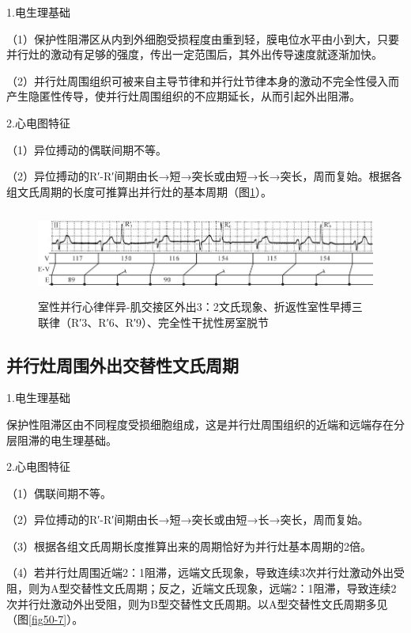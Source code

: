 1.电生理基础

（1）保护性阻滞区从内到外细胞受损程度由重到轻，膜电位水平由小到大，只要并行灶的激动有足够的强度，传出一定范围后，其外出传导速度就逐渐加快。

（2）并行灶周围组织可被来自主导节律和并行灶节律本身的激动不完全性侵入而产生隐匿性传导，使并行灶周围组织的不应期延长，从而引起外出阻滞。

2.心电图特征

（1）异位搏动的偶联间期不等。

（2）异位搏动的R′-R′间期由长→短→突长或由短→长→突长，周而复始。根据各组文氏周期的长度可推算出并行灶的基本周期（图\ref{fig16-19}）。

\begin{figure}[!htbp]
 \centering
 \includegraphics[width=5.78125in,height=1.11458in]{./images/Image00295.jpg}
 \captionsetup{justification=centering}
 \caption{室性并行心律伴异-肌交接区外出3：2文氏现象、折返性室性早搏三联律（R′3、R′6、R′9）、完全性干扰性房室脱节}
 \label{fig16-19}
  \end{figure} 

\protect\hypertarget{text00023.htmlux5cux23subid294}{}{}

\subsection{并行灶周围外出交替性文氏周期}

1.电生理基础

保护性阻滞区由不同程度受损细胞组成，这是并行灶周围组织的近端和远端存在分层阻滞的电生理基础。

2.心电图特征

（1）偶联间期不等。

（2）异位搏动的R′-R′间期由长→短→突长或由短→长→突长，周而复始。

（3）根据各组文氏周期长度推算出来的周期恰好为并行灶基本周期的2倍。

（4）若并行灶周围近端2：1阻滞，远端文氏现象，导致连续3次并行灶激动外出受阻，则为A型交替性文氏周期；反之，近端文氏现象，远端2：1阻滞，导致连续2次并行灶激动外出受阻，则为B型交替性文氏周期。以A型交替性文氏周期多见（图\ref{fig50-7}）。

\protect\hypertarget{text00023.htmlux5cux23subid295}{}{}

